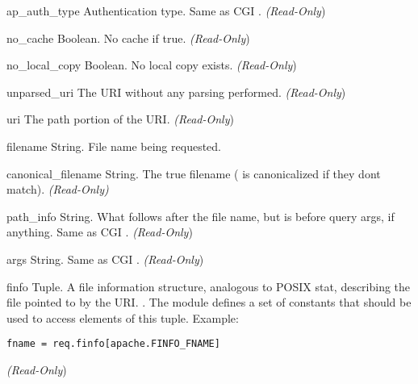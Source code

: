 \begin{memberdesc}[request]{ap_auth_type}
Authentication type. Same as CGI .
\emph{(Read-Only})
\end{memberdesc}

\begin{memberdesc}[request]{no_cache}
Boolean. No cache if true.
\emph{(Read-Only})
\end{memberdesc}

\begin{memberdesc}[request]{no_local_copy}
Boolean. No local copy exists.
\emph{(Read-Only})
\end{memberdesc}

\begin{memberdesc}[request]{unparsed_uri}
The URI without any parsing performed.
\emph{(Read-Only})
\end{memberdesc}

\begin{memberdesc}[request]{uri}
The path portion of the URI.
\emph{(Read-Only})
\end{memberdesc}

\begin{memberdesc}[request]{filename}
String. File name being requested.
\end{memberdesc}

\begin{memberdesc}[request]{canonical_filename}
String. The true filename ( is canonicalized if
they dont match).  \emph{(Read-Only)}
\end{memberdesc}

\begin{memberdesc}[request]{path_info}
String. What follows after the file name, but is before query args, if
anything. Same as CGI .
\emph{(Read-Only})
\end{memberdesc}

\begin{memberdesc}[request]{args}
String. Same as CGI .
\emph{(Read-Only})
\end{memberdesc}

\begin{memberdesc}[request]{finfo}
Tuple. A file information structure, analogous to POSIX stat,
describing the file pointed to by the URI.  . The  module defines a set of 
constants that should be used to access elements of this
tuple. Example:
\begin{verbatim}
fname = req.finfo[apache.FINFO_FNAME]
\end{verbatim}
\emph{(Read-Only})
\end{memberdesc}

